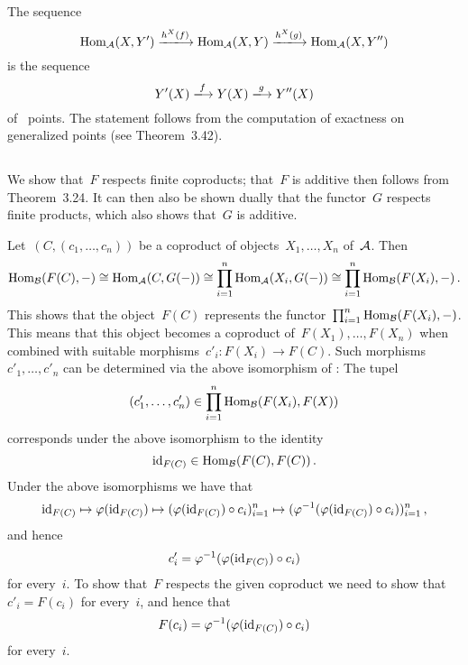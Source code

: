 \section{}





\subsection{}

The sequence
\[
  \Hom_\Acat(X, Y')
  \xlongto{h^X(f)}
  \Hom_\Acat(X, Y)
  \xlongto{h^X(g)}
  \Hom_\Acat(X, Y'')
\]
is the sequence
\[
  Y'(X)
  \xlongto{f}
  Y(X)
  \xlongto{g}
  Y''(X)
\]
of~ points.
The statement follows from the computation of exactness on generalized points (see Theorem~3.42).





\subsection{}

We show that~$F$ respects finite coproducts; that~$F$ is additive then follows from Theorem~3.24.
It can then also be shown dually that the functor~$G$ respects finite products, which also shows that~$G$ is additive.

Let~$(C, (c_1, \dotsc, c_n))$ be a coproduct of objects~$X_1, \dotsc, X_n$ of~$\mathcal{A}$.
Then
\[
  \operatorname{Hom}_{\mathcal{B}}(F(C), -)
  \cong
  \operatorname{Hom}_{\mathcal{A}}(C, G(-))
  \cong
  \prod_{i=1}^n \operatorname{Hom}_{\mathcal{A}}(X_i, G(-))
  \cong
  \prod_{i=1}^n \operatorname{Hom}_{\mathcal{B}}(F(X_i), -) \,.
\]
This shows that the object~$F(C)$ represents the functor~$\prod_{i=1}^n \operatorname{Hom}_{\mathcal{B}}(F(X_i), -)$.
This means that this object becomes a coproduct of~$F(X_1), \dotsc, F(X_n)$ when combined with suitable morphisms~$c'_i \colon F(X_i) \to F(C)$.
Such morphisms~$c'_1, \dotsc, c'_n$ can be determined via the above isomorphism of :
The tupel
\[
  (c'_1, \dotsc, c'_n)
  \in
  \prod_{i=1}^n \operatorname{Hom}_{\mathcal{B}}(F(X_i), F(X))
\]
corresponds under the above isomorphism to the identity
\[
  \operatorname{id}_{F(C)}
  \in
  \operatorname{Hom}_{\mathcal{B}}(F(C), F(C))  \,.
\]
Under the above isomorphisms we have that
\[
  \operatorname{id}_{F(C)}
  \mapsto
  \varphi(\operatorname{id}_{F(C)})
  \mapsto
  ( \varphi(\operatorname{id}_{F(C)}) \circ c_i )_{i=1}^n
  \mapsto
  ( \varphi^{-1}(\varphi(\operatorname{id}_{F(C)}) \circ c_i) )_{i=1}^n \,,
\]
and hence
\[
  c'_i
  =
  \varphi^{-1}(\varphi(\operatorname{id}_{F(C)}) \circ c_i)
\]
for every~$i$.
To show that~$F$ respects the given coproduct we need to show that~$c'_i = F(c_i)$ for every~$i$, and hence that
\[
  F(c_i)
  =
  \varphi^{-1}(\varphi(\operatorname{id}_{F(C)}) \circ c_i)
\]
for every~$i$.

